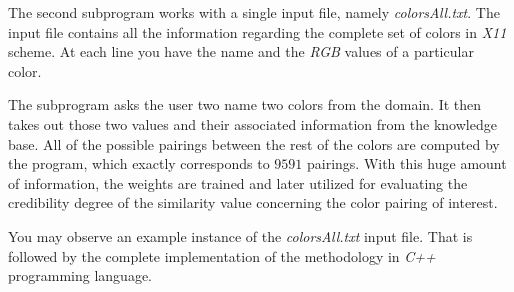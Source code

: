 The second subprogram works with a single input file, namely \textit{colorsAll.txt}.  The input file contains all the information regarding the complete set of colors in \textit{X11} scheme. At each line you have the name and the \textit{RGB} values of a particular color. 

The subprogram asks the user two name two colors from the domain. It then takes out those two values and their associated information from the knowledge base. All of the possible pairings between the rest of the colors are computed by the program, which exactly corresponds to $9591$ pairings. With this huge amount of information, the weights are trained and later utilized for evaluating the credibility degree of the similarity value concerning the color pairing of interest.

You may observe an example instance of the \textit{colorsAll.txt} input file. That is followed by the complete implementation of the methodology in \textit{C++} programming language.

